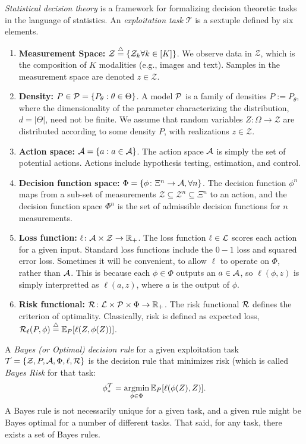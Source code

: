 \documentclass{article}
\begin{document}
\emph{Statistical decision theory} is a framework for formalizing decision theoretic tasks in the language of statistics.  An \emph{exploitation task} $\mathcal{T}$ is a sextuple defined by six elements.
\begin{enumerate}
  \item \textbf{Measurement Space:} $\mathcal{Z} \overset{\triangle}{=} \{ \mathcal{Z}_k \forall k \in [K]\}$. We observe data in $\mathcal{Z}$, which is the composition of  $K$ modalities (e.g., images and text).  Samples in the measurement space are denoted  $z \in \mathcal{Z}$.  
	\item \textbf{Density:} $P \in \mathcal{P}=\{P_{\theta}: \theta \in \Theta\}$.  A model $\mathcal{P}$ is a family of densities $P := P_{\theta}$, where the dimensionality of the parameter characterizing the distribution, $d=|\Theta|$, need not be finite.     We assume that random variables $Z \colon \Omega \to \mathcal{Z}$  are distributed according to some density $P$, with realizations $z \in \mathcal{Z}$.
	\item \textbf{Action space:} $\mathcal{A}=\{a : a \in \mathcal{A}\}$.  The action space $\mathcal{A}$ is simply the set of potential actions.  Actions  include hypothesis testing, estimation, and control. 
	\item \textbf{Decision function space:} $\Phi = \{\phi \colon \Xi^n \to \mathcal{A}, \forall n \}$. The decision function $\phi^n$ maps from a sub-set of measurements $\mathcal{Z} \subseteq \mathcal{Z}^n \subseteq \Xi^n$ to an action, and the decision function space $\Phi^n$ is the set of admissible decision functions for $n$ measurements.
	\item \textbf{Loss function:} $\ell \colon \mathcal{A} \times \mathcal{Z} \to \mathbb{R}_+$.  The loss function $\ell \in \mathcal{L}$ scores each action for a given input.  Standard loss functions include the $0-1$ loss and squared error loss. Sometimes it will be convenient,  to allow $\ell$ to operate on $\Phi$, rather than $\mathcal{A}$. This is because each $\phi \in \Phi$ outputs an $a \in \mathcal{A}$, so $\ell(\phi,z)$ is simply interpretted as $\ell(a,z)$, where $a$ is the output of $\phi$.
	\item \textbf{Risk functional:} $\mathcal{R} \colon \mathcal{L} \times \mathcal{P} \times \Phi \to \mathbb{R}_+$.	The risk functional $\mathcal{R}$ defines the criterion of optimality.  Classically, risk is defined as expected loss, $\mathcal{R}_\ell(P,\phi) \overset{\triangle}{=} \mathbb{E}_P[\ell(Z,\phi(Z))]$.
\end{enumerate}

\noindent  A \emph{Bayes (or Optimal) decision rule} for a given exploitation task $\mathcal{T}=\{\mathcal{Z}, P, \mathcal{A}, \Phi, \ell, \mathcal{R}\}$ is the decision rule that minimizes risk (which is called \emph{Bayes Risk} for that task: 
\begin{align}
    \phi_*^\mathcal{T} = \argmin_{\phi \in \Phi} \EE_P [\ell(\phi(Z), Z)].
\end{align}
A Bayes rule is not necessarily unique for a given task, and a given rule might be Bayes optimal for a number of different tasks.  That said, for any task, there exists a set of Bayes rules.  
\end{document}
